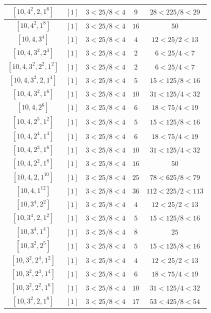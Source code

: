 \documentclass{article}%
\begin{document}
\begin{center}
\begin{longtable}{||c|c|c|c|c||}
$[10, 4^{2}, 2, 1^{6}]$ & $[1]$ & $3 < 25/8 < 4$ & $9$ & $28 < 225/8 < 29$ \\ \hline 
$[10, 4^{2}, 1^{8}]$ & $[1]$ & $3 < 25/8 < 4$ & $16$ & $50$ \\ \hline 
$[10, 4, 3^{4}]$ & $[1]$ & $3 < 25/8 < 4$ & $4$ & $12 < 25/2 < 13$ \\ \hline 
$[10, 4, 3^{2}, 2^{3}]$ & $[1]$ & $3 < 25/8 < 4$ & $2$ & $6 < 25/4 < 7$ \\ \hline 
$[10, 4, 3^{2}, 2^{2}, 1^{2}]$ & $[1]$ & $3 < 25/8 < 4$ & $2$ & $6 < 25/4 < 7$ \\ \hline 
$[10, 4, 3^{2}, 2, 1^{4}]$ & $[1]$ & $3 < 25/8 < 4$ & $5$ & $15 < 125/8 < 16$ \\ \hline 
$[10, 4, 3^{2}, 1^{6}]$ & $[1]$ & $3 < 25/8 < 4$ & $10$ & $31 < 125/4 < 32$ \\ \hline 
$[10, 4, 2^{6}]$ & $[1]$ & $3 < 25/8 < 4$ & $6$ & $18 < 75/4 < 19$ \\ \hline 
$[10, 4, 2^{5}, 1^{2}]$ & $[1]$ & $3 < 25/8 < 4$ & $5$ & $15 < 125/8 < 16$ \\ \hline 
$[10, 4, 2^{4}, 1^{4}]$ & $[1]$ & $3 < 25/8 < 4$ & $6$ & $18 < 75/4 < 19$ \\ \hline 
$[10, 4, 2^{3}, 1^{6}]$ & $[1]$ & $3 < 25/8 < 4$ & $10$ & $31 < 125/4 < 32$ \\ \hline 
$[10, 4, 2^{2}, 1^{8}]$ & $[1]$ & $3 < 25/8 < 4$ & $16$ & $50$ \\ \hline 
$[10, 4, 2, 1^{10}]$ & $[1]$ & $3 < 25/8 < 4$ & $25$ & $78 < 625/8 < 79$ \\ \hline 
$[10, 4, 1^{12}]$ & $[1]$ & $3 < 25/8 < 4$ & $36$ & $112 < 225/2 < 113$ \\ \hline 
$[10, 3^{4}, 2^{2}]$ & $[1]$ & $3 < 25/8 < 4$ & $4$ & $12 < 25/2 < 13$ \\ \hline 
$[10, 3^{4}, 2, 1^{2}]$ & $[1]$ & $3 < 25/8 < 4$ & $5$ & $15 < 125/8 < 16$ \\ \hline 
$[10, 3^{4}, 1^{4}]$ & $[1]$ & $3 < 25/8 < 4$ & $8$ & $25$ \\ \hline 
$[10, 3^{2}, 2^{5}]$ & $[1]$ & $3 < 25/8 < 4$ & $5$ & $15 < 125/8 < 16$ \\ \hline 
$[10, 3^{2}, 2^{4}, 1^{2}]$ & $[1]$ & $3 < 25/8 < 4$ & $4$ & $12 < 25/2 < 13$ \\ \hline 
$[10, 3^{2}, 2^{3}, 1^{4}]$ & $[1]$ & $3 < 25/8 < 4$ & $6$ & $18 < 75/4 < 19$ \\ \hline 
$[10, 3^{2}, 2^{2}, 1^{6}]$ & $[1]$ & $3 < 25/8 < 4$ & $10$ & $31 < 125/4 < 32$ \\ \hline 
$[10, 3^{2}, 2, 1^{8}]$ & $[1]$ & $3 < 25/8 < 4$ & $17$ & $53 < 425/8 < 54$ \\ \hline 

\end{longtable}
\end{center}
\end{document}
